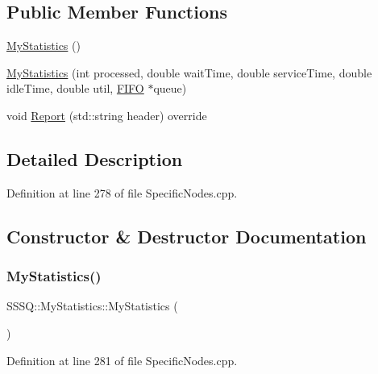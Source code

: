 \subsection*{Public Member Functions}
\begin{DoxyCompactItemize}
\item 
\hyperlink{class_s_s_s_q_1_1_my_statistics_ac80e1e32d280054d066816e517303afe}{My\+Statistics} ()
\item 
\hyperlink{class_s_s_s_q_1_1_my_statistics_af2e9214ebae8b846ae9beefbfb65f3de}{My\+Statistics} (int processed, double wait\+Time, double service\+Time, double idle\+Time, double util, \hyperlink{class_f_i_f_o}{F\+I\+FO} $\ast$queue)
\item 
void \hyperlink{class_s_s_s_q_1_1_my_statistics_a6dec552109226c307ffbb81f45ec3eb9}{Report} (std\+::string header) override
\end{DoxyCompactItemize}


\subsection{Detailed Description}


Definition at line 278 of file Specific\+Nodes.\+cpp.



\subsection{Constructor \& Destructor Documentation}
\mbox{\label{class_s_s_s_q_1_1_my_statistics_ac80e1e32d280054d066816e517303afe}} 
\subsubsection{\texorpdfstring{My\+Statistics()}{MyStatistics()}\hspace{0.1cm}{\footnotesize\ttfamily [1/2]}}
{\footnotesize\ttfamily S\+S\+S\+Q\+::\+My\+Statistics\+::\+My\+Statistics (\begin{DoxyParamCaption}{ }\end{DoxyParamCaption})\hspace{0.3cm}{\ttfamily [inline]}}



Definition at line 281 of file Specific\+Nodes.\+cpp.

